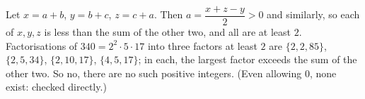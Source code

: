 Let $x=a+b$, $y=b+c$, $z=c+a$. Then $a=\dfrac{x+z-y}{2}>0$ and similarly, so each of $x,y,z$ is less than the sum of the other two, and all are at least $2$. Factorisations of $340=2^2\cdot5\cdot17$ into three factors at least $2$ are $\{2,2,85\}$, $\{2,5,34\}$, $\{2,10,17\}$, $\{4,5,17\}$; in each, the largest factor exceeds the sum of the other two. So $\boxed{\text{no}}$, there are no such positive integers. (Even allowing $0$, none exist: checked directly.)

